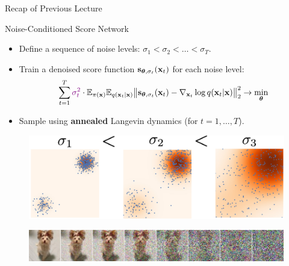 \documentclass{beamer}
\begin{document}
\begin{frame}{Recap of Previous Lecture}
    \begin{block}{Noise-Conditioned Score Network}
        \begin{itemize}
            \item Define a sequence of noise levels: $\sigma_1 < \sigma_2 < \dots < \sigma_T$.
            \item Train a denoised score function $\mathbf{s}_{\boldsymbol{\theta}, \sigma_t}(\mathbf{x}_t)$ for each noise level:
            \vspace{-0.3cm}
            \[
                \sum_{t=1}^T {\color{violet}\sigma_t^2} \cdot \mathbb{E}_{\pi(\mathbf{x})} \mathbb{E}_{q(\mathbf{x}_t | \mathbf{x})}\bigl\| \mathbf{s}_{\boldsymbol{\theta}, \sigma_t}(\mathbf{x}_t) - \nabla_{\mathbf{x}_t} \log q(\mathbf{x}_t | \mathbf{x}) \bigr\|^2_2 \rightarrow \min_{\boldsymbol{\theta}}
            \]
            \vspace{-0.5cm}
            \item Sample using \textbf{annealed} Langevin dynamics (for $t=1, \dots, T$).
        \end{itemize}
    \end{block}
    \begin{figure}
        \includegraphics[width=0.55\linewidth]{figs/multi_scale}
    \end{figure}
    \begin{figure}
        \includegraphics[width=\linewidth]{figs/duoduo}
    \end{figure}
\end{frame}
\end{document}
